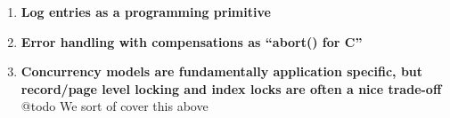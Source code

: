 \documentclass[letterpaper,twocolumn,english]{article}
\newcommand{\yad}{Lemon\xspace}
\begin{document}
\begin{enumerate}

  \item {\bf Log entries as a programming primitive }


  \item {\bf Error handling with compensations as {}``abort() for C''}


  \item {\bf Concurrency models are fundamentally application specific, but
  record/page level locking and index locks are often a nice trade-off}  @todo We sort of cover this above

%

    



\end{enumerate}
\end{document}
